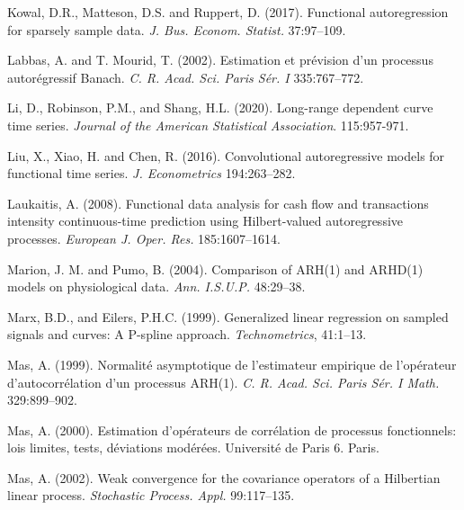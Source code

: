 \documentclass[11pt,a4paper]{article}
\begin{document}
\begin{thebibliography}{9}
Kowal, D.R., Matteson,  D.S. and  Ruppert, D. (2017).
	Functional autoregression for sparsely sample data. \emph{J. Bus. Econom. Statist.} 37:97--109.
	

	
 Labbas, A. and T. Mourid, T.  (2002).
	Estimation et pr\'evision d'un processus autor\'egressif {B}anach.
	\emph{C. R. Acad. Sci. Paris S\'er. I} 335:767--772.


Li, D., Robinson, P.M., and Shang, H.L. (2020). Long-range dependent curve time series. \emph{Journal of the American Statistical Association}. 115:957-971.

 Liu, X.,   Xiao, H. and  Chen, R. (2016).
	Convolutional autoregressive models for functional time series.
	\emph{J. Econometrics}  194:263--282.
	
Laukaitis,  A.  (2008).
	Functional data analysis for cash flow and transactions intensity continuous-time prediction using {H}ilbert-valued autoregressive processes.
	\emph{European J. Oper. Res.} 185:1607--1614.


 Marion, J. M. and  Pumo, B. (2004).
	Comparison of {ARH}(1) and {ARHD}(1) models on physiological data.
	\emph{Ann. I.S.U.P.} 48:29--38.
	
Marx, B.D., and Eilers, P.H.C. (1999). Generalized linear regression on sampled signals and curves: A P-spline approach. \emph{Technometrics}, 41:1--13.

Mas,  A. (1999).
	Normalit\'e asymptotique de l'estimateur empirique de l'op\'erateur d'autocorr\'elation d'un processus {ARH}(1).
	\emph{C. R. Acad. Sci. Paris S\'er. I Math.} 329:899--902.
	
Mas,  A. (2000).
  	Estimation d'op\'erateurs de corr\'elation de processus fonctionnels: lois limites, tests, d\'eviations mod\'er\'ees.
  Universit\'e de Paris 6. Paris.


Mas,  A. (2002).	
	Weak convergence for the covariance operators of a {H}ilbertian linear process.
	\emph{Stochastic Process. Appl.}  99:117--135.
	

\end{thebibliography}
\end{document}
